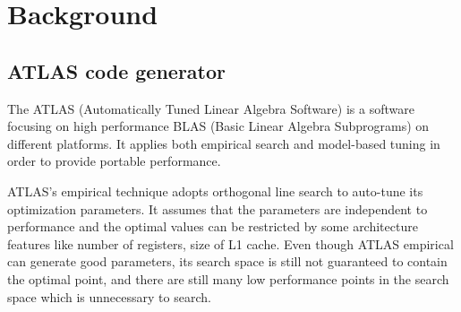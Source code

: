 \section{Background}
\label{sec:background}

  \subsection{ATLAS code generator}
  \label{sec:atlas_intro}
  The ATLAS (Automatically Tuned Linear Algebra Software) is a software focusing on high performance 
  BLAS (Basic Linear Algebra Subprograms) on different platforms. It applies both empirical search and model-based 
  tuning in order to provide portable performance. \par
  ATLAS's empirical technique adopts orthogonal line search to auto-tune its optimization parameters.
  It assumes that the parameters are independent to performance and the optimal values can be
  restricted by some architecture features like number of registers, size of L1 cache.
  Even though ATLAS empirical can generate good parameters, its search space is still not guaranteed to contain
  the optimal point, and there are still many low performance points in the search space which is unnecessary
  to search.

